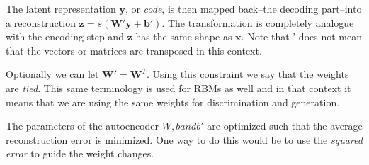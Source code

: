 \documentclass[11pt]{article}
\begin{document}
The latent representation $\mathbf{y}$, or \textit{code}, is then mapped back--the decoding part--into a reconstruction $\mathbf{z} = s(\mathbf{W'}\mathbf{y} + \mathbf{b'})$.  The transformation is completely analogue with the encoding step and $\mathbf{z}$ has the same shape as $\mathbf{x}$.  Note that ' does not mean that the vectors or matrices are transposed in this context.

Optionally we can let $\mathbf{W'} = \mathbf{W}^T$.  Using this constraint we say that the weights are \textit{tied}.  This same terminology is used for RBMs as well and in that context it means that we are using the same weights for discrimination and generation.

The parameters of the autoencoder $W, b and b'$ are optimized such that the average reconstruction error is minimized.  One way to do this would be to use the \textit{squared error} to guide the weight changes.
\end{document}
